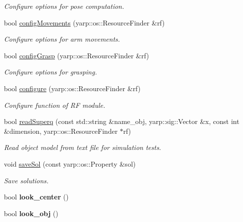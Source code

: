 \begin{DoxyCompactItemize}
\begin{DoxyCompactList}\small\item\em Configure options for pose computation. \end{DoxyCompactList}\item 
bool \hyperlink{classGraspingModule_af83c4dc5cdc8ed18a03ce2637abda2e9}{config\+Movements} (yarp\+::os\+::\+Resource\+Finder \&rf)
\begin{DoxyCompactList}\small\item\em Configure options for arm movements. \end{DoxyCompactList}\item 
bool \hyperlink{classGraspingModule_a31c82e1ba3c80d1238e95449780f62c6}{config\+Grasp} (yarp\+::os\+::\+Resource\+Finder \&rf)
\begin{DoxyCompactList}\small\item\em Configure options for grasping. \end{DoxyCompactList}\item 
bool \hyperlink{classGraspingModule_ab4c0ea3cabb2cc6de63da53ba1771e27}{configure} (yarp\+::os\+::\+Resource\+Finder \&rf)\label{classGraspingModule_ab4c0ea3cabb2cc6de63da53ba1771e27}

\begin{DoxyCompactList}\small\item\em Configure function of RF module. \end{DoxyCompactList}\item 
bool \hyperlink{classGraspingModule_aa1c32186a8b7133db63e115898949b28}{read\+Superq} (const std\+::string \&name\+\_\+obj, yarp\+::sig\+::\+Vector \&x, const int \&dimension, yarp\+::os\+::\+Resource\+Finder $\ast$rf)
\begin{DoxyCompactList}\small\item\em Read object model from text file for simulation tests. \end{DoxyCompactList}\item 
void \hyperlink{classGraspingModule_a43a89c97919dd68a4ab28a6c9fe16a95}{save\+Sol} (const yarp\+::os\+::\+Property \&sol)
\begin{DoxyCompactList}\small\item\em Save solutions. \end{DoxyCompactList}\item 
bool {\bfseries look\+\_\+center} ()\label{classGraspingModule_af640219e03fdfe6e6145a5ff6f01d23a}

\item 
bool {\bfseries look\+\_\+obj} ()\label{classGraspingModule_a741cac4968db05d8dde9cd1856776c50}


\end{DoxyCompactItemize}
